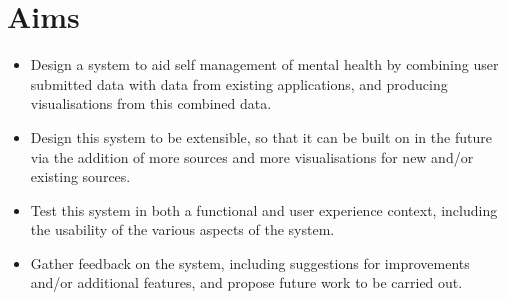 \documentclass[11pt,openright,a4paper]{report}
\begin{document}
\section{Aims} \label{aims}
\begin{itemize}
\item Design a system to aid self management of mental health by combining user submitted data with data from existing applications, and producing visualisations from this combined data.
\item Design this system to be extensible, so that it can be built on in the future via the addition of more sources and more visualisations for new and/or existing sources.
\item Test this system in both a functional and user experience context, including the usability of the various aspects of the system.
\item Gather feedback on the system, including suggestions for improvements and/or additional features, and propose future work to be carried out.
\end{itemize}
\end{document}
